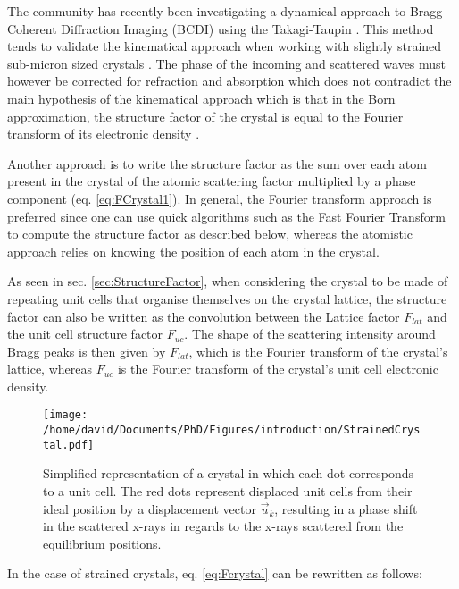 The community has recently been investigating a dynamical approach to Bragg Coherent Diffraction Imaging (BCDI) \parencite{Yan2014, Shabalin2017, Hu2018, Gao2022} using the Takagi-Taupin \parencite{Takagi1962, Takagi1969}.
This method tends to validate the kinematical approach when working with slightly strained sub-micron sized crystals \parencite{Karpov2019, Barringer2021}.
The phase of the incoming and scattered waves must however be corrected for refraction and absorption \parencite{Harder2007, Gao2022} which does not contradict the main hypothesis of the kinematical approach which is that in the Born approximation, the structure factor of the crystal is equal to the Fourier transform of its electronic density \parencite{Paganin}.

Another approach is to write the structure factor as the sum over each atom present in the crystal of the atomic scattering factor multiplied by a phase component (eq. \ref{eq:FCrystal1}).
In general, the Fourier transform approach is preferred since one can use quick algorithms such as the Fast Fourier Transform \parencite{Cooley1965, Cochran1967} to compute the structure factor as described below, whereas the atomistic approach relies on knowing the position of each atom in the crystal.

As seen in sec. \ref{sec:StructureFactor}, when considering the crystal to be made of repeating unit cells that organise themselves on the crystal lattice, the structure factor can also be written as the convolution between the Lattice factor $F_{lat}$ and the unit cell structure factor $F_{uc}$.
The shape of the scattering intensity around Bragg peaks is then given by $F_{lat}$, which is the Fourier transform of the crystal's lattice, whereas $F_{uc}$ is the Fourier transform of the crystal's unit cell electronic density.

\begin{figure}[!htb]
    \centering
    \texttt{[image: /home/david/Documents/PhD/Figures/introduction/StrainedCrystal.pdf]}
    \caption{
    Simplified representation of a crystal in which each dot corresponds to a unit cell.
    The red dots represent displaced unit cells from their ideal position by a displacement vector $\vec{u}_k$, resulting in a phase shift in the scattered x-rays in regards to the x-rays scattered from the equilibrium positions.
    }
    \label{fig:StrainedCrystals}
\end{figure}

In the case of strained crystals, eq. \ref{eq:Fcrystal} can be rewritten as follows:

